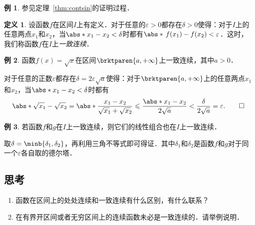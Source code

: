 \documentclass[a4paper,punct=CCT]{ctexbook}
\makeatletter
\theoremstyle{definition}
\newtheorem*{definition*}{定义}
\newtheorem*{example*}{例}
\theoremstyle{remark}
\renewenvironment{proof}[1][\proofname]{\par
  \pushQED{\qed}%
  \normalfont \topsep6\p@\@plus6\p@\relax
  \trivlist
  \item[]\ignorespaces
}{%
  \popQED\endtrivlist\@endpefalse
}
\let\leq\leqslant
\let\le\leq
\makeatother
\begin{document}
\begin{example*}
  参见定理~\ref{thm:contsin}的证明过程．
\end{example*}

\begin{definition*}
  \label{defn:unicont}
  设函数\(f\)在区间\(I\)上有定义．对于任意的\(\varepsilon > 0\)都存在\(\delta > 0\)使得：对于\(I\)上的任意两点\(x_1\)和\(x_2\)，当\(\abs*{x_1 - x_2} < \delta\)时都有\(\abs*{\,f(x_1) - f(x_2)} < \varepsilon\)．这时，我们称函数\(f\)在\(I\)上\emph{一致连续}．
\end{definition*}

\begin{example*}
  函数\(f(x) = \sqrt x\)在区间\(\brktparen{a,+\infty}\)上一致连续，其中\(a > 0\)．

  \begin{proof}
    对于任意的正数\(\varepsilon\)都存在\(\delta = 2 \varepsilon \sqrt a\)使得：对于\(\brktparen{a,+\infty}\)上的任意两点\(x_1\)和\(x_2\)，当\(\abs*{x_1 - x_2} < \delta\)时都有
    \begin{equation*}
      \abs*{\sqrt{\smash[b]{x_1}\!}\, - \sqrt{\smash[b]{x_2}\!}\,}
      = \abs*{\frac{x_1 - x_2}{\sqrt{\smash[b]{x_1}\!}\, + \sqrt{\smash[b]{x_2}\!}\,}}
      \le \frac{\abs*{x_1 - x_2}}{2 \sqrt a}
      < \frac{\delta}{2 \sqrt a}
      = \varepsilon.
      \qedhere
    \end{equation*}
  \end{proof}
\end{example*}

\begin{example*}
  若函数\(f\)和\(g\)在\(I\)上一致连续，则它们的线性组合也在\(I\)上一致连续．

  \begin{proof}
    取\(\delta = \minb{\delta_1, \delta_2}\)，再利用三角不等式即可得证．其中\(\delta_1\)和\(\delta_2\)是函数\(f\)和\(g\)对于同一个\(\varepsilon\)各自取的德尔塔．
  \end{proof}
\end{example*}

\subsection*{思考}

\begin{enumerate}
\item 函数在区间上的处处连续和一致连续有什么区别，有什么联系？
\item 在有界开区间或者无穷区间上的连续函数未必是一致连续的．请举例说明．
\end{enumerate}
\end{document}

